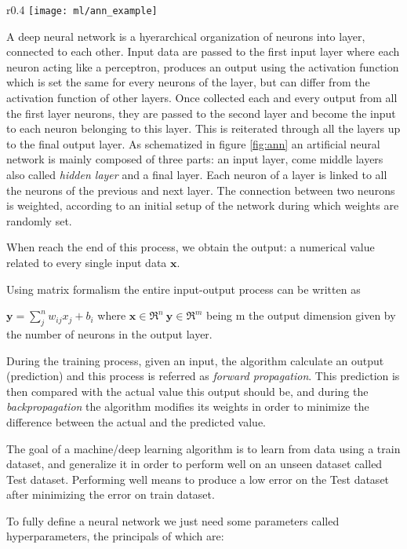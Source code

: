 \documentclass[a4paper,11pt]{article}
\begin{document}
\begin{wrapfigure}{r}{0.4\textwidth}
\centering
\texttt{[image: ml/ann\_example]}
\caption{Artificial Neural Network}
\label{fig:ann}
\end{wrapfigure}


A deep neural network is a hyerarchical organization of neurons into layer, connected to each other.
Input data are passed to the first input layer where each neuron acting like a perceptron, produces an output using the activation function which is set the same for every neurons of the layer, but can differ from the activation function of other layers.
Once collected each and every output from all the first layer neurons, they are passed to the second layer and become the input to each neuron belonging to this layer.
This is reiterated through all the layers up to the final output layer.
As schematized in figure \ref{fig:ann} an artificial neural network is mainly composed of three parts: an input layer, come middle layers also  called \emph{hidden layer} and a final layer. Each neuron of a layer is linked to all the neurons of the previous and next layer.
The connection between two neurons is weighted, according to an initial setup of the network during which weights are randomly set.

When reach the end of this process, we obtain the output: a numerical value related to every single input data $\textbf{x}$.

Using matrix formalism the entire input-output process can be written as

$\textbf{y} = \sum_j^n w_{ij} x_j + b_i $ where $\textbf{x} \in \Re^n \ \textbf{y} \in \Re^m $ being m the output dimension given by the number of neurons in the output layer.


During the training process, given an input, the algorithm calculate an output (prediction) and this process is referred as  \emph{forward propagation}.
This prediction is then compared with the actual value this output should be, and during the \emph{backpropagation} the algorithm modifies its weights in order to minimize the difference between the actual and the predicted value.

The goal of a machine/deep learning algorithm is to learn from data using a train dataset, and generalize it in order to perform well on an unseen dataset called Test dataset.
Performing well means to produce a low error on the Test dataset after minimizing the error on train dataset.


To fully define a neural network we just need some parameters called hyperparameters, the principals of which are:
\end{document}
